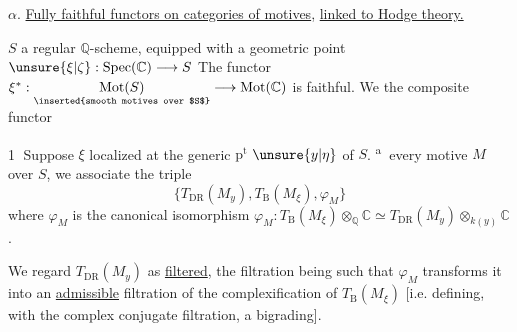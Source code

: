 \textcircled{$\alpha$}. \uline{Fully faithful functors on categories of motives}, \uline{linked to Hodge theory.}

$S$ a regular $\mathbb{Q}$-scheme, equipped with a geometric point $\unsure{\xi|\zeta}:\operatorname{Spec}(\mathbb{C})\longrightarrow S$
The functor $\xi^*:\underset{\text{\inserted{smooth motives over $S$}}}{\operatorname{Mot}(S)}\longrightarrow\operatorname{Mot}(\mathbb{C})$ is faithful. We  the composite functor

\textcircled{1}  Suppose $\xi$ localized at the generic $\mathrm{p}^{\mathrm t}$ $\unsure{y|\eta}$ of $S$.  \textsuperscript{\textcircled{a}}  every motive $M$ over $S$, we associate the triple
\[
\bigl\{T_{\mathrm{DR}}(M_y),T_{\mathrm B}(M_\xi),\varphi_M\bigr\}
\]
where $\varphi_M$ is the canonical isomorphism $\varphi_M:T_{\mathrm B}(M_\xi)\otimes_{\mathbb Q}\mathbb C\simeq T_{\mathrm{DR}}(M_y)\otimes_{k(y)}\mathbb C$.

We regard $T_{\mathrm{DR}}(M_y)$ as \uline{filtered}, the filtration being such that $\varphi_M$ transforms it into an \uline{admissible} filtration of the complexification of $T_{\mathrm B}(M_\xi)$ [i.e. defining, with the complex conjugate filtration, a bigrading].

